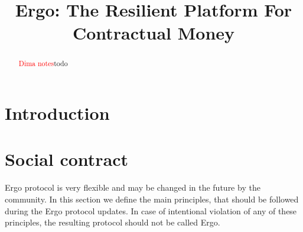 \documentclass[]{article}
\newcommand{\dnote}[1]{{\textcolor{red}{Dima notes}}{#1}}
\newcommand{\Ergo}{Ergo}
\begin{document}
    \title{Ergo: The Resilient Platform For Contractual Money}


    \maketitle

    \begin{abstract}
        \dnote{todo}
    \end{abstract}



    \section{Introduction}


    \section{Social contract}

    \Ergo{} protocol is very flexible and may be changed in the future by the community.
    In this section we define the main principles, that should be followed during the \Ergo{} protocol updates.
    In case of intentional violation of any of these principles, the resulting protocol should not
    be called \Ergo{}.
\end{document}

